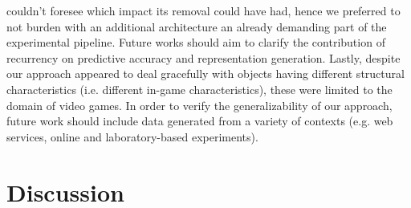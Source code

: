 couldn't foresee which impact its removal could have had, hence we preferred to not burden with an additional architecture an already demanding part of the experimental pipeline. Future works should aim to clarify the contribution of recurrency on predictive accuracy and representation generation. Lastly, despite our approach appeared to deal gracefully  with objects having different structural characteristics (i.e. different in-game characteristics), these were limited to the domain of video games. In order to verify the generalizability of our approach, future work should include data generated from a variety of contexts (e.g. web services, online and laboratory-based experiments).

\section{Discussion}
\label{discussion_3}

